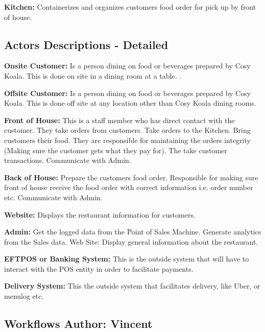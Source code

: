 \documentclass{article}
\begin{document}
\textbf{Kitchen:} Containerizes and organizes customers food order for pick up by front of house.



\subsection{Actors Descriptions - Detailed}

\textbf{Onsite Customer:} Is a person dining on food or beverages prepared by Cosy Koala. This is done on site in a dining room at a table. .

\textbf{Offsite Customer:} Is a person dining on food or beverages prepared by Cosy Koala. This is done off site at any location other than Cosy Koala dining rooms.

\textbf{Front of House:} This is a staff member who has direct contact with the customer. They take orders from customers. Take orders to the Kitchen. Bring customers their food. They are responsible for maintaining the orders integrity (Making sure the customer gets what they pay for). The take customer transactions. Communicate with Admin.

\textbf{Back of House:} Prepare the customers food order. Responsible for making sure front of house receive the food order with correct information i.e. order number etc. Communicate with Admin.

\textbf{Website:} Displays the restaurant information for customers.

\textbf{Admin:} Get the logged data from the Point of Sales Machine.
Generate analytics from the Sales data.
Web Site: Display general information about the restaurant.

\textbf{EFTPOS or Banking System:} This is the outside system that will have to interact with the POS entity in order to facilitate payments.

\textbf{Delivery System:} This the outside system that facilitates delivery, like Uber, or menulog etc.


\clearpage
\subsection{Workflows \normalsize\textbf{Author: Vincent}}
\end{document}
